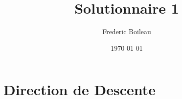 
\renewcommand{\familydefault}{\sfdefault}
\usepackage{titling}
\usepackage{amsmath}
\usepackage{fancyhdr}
\pagestyle{fancy}

\title{Solutionnaire 1}
\author{Frederic Boileau}
\date{\today}




\fancyhf{}
\maketitle
\thispagestyle{fancy}


\section{Direction de Descente}

\clearpage





